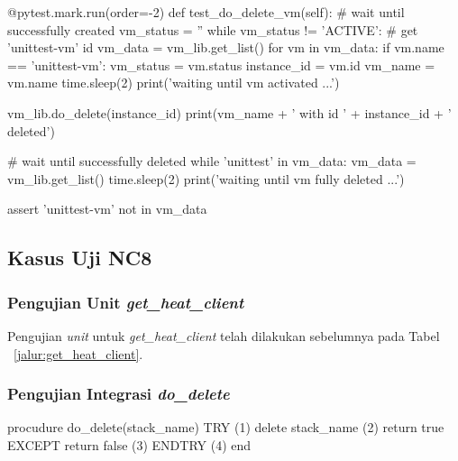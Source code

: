 \begin{code}
\begin{ignasicblock}[title=test\_do\_delete\_vm,minted language=Python]
@pytest.mark.run(order=-2)
    def test_do_delete_vm(self):
        # wait until successfully created
        vm_status = ''
        while vm_status != 'ACTIVE':
            # get 'unittest-vm' id
            vm_data = vm_lib.get_list()
            for vm in vm_data:
                if vm.name == 'unittest-vm':
                    vm_status = vm.status
                    instance_id = vm.id
                    vm_name = vm.name
            time.sleep(2)
            print('waiting until vm activated ...')

        vm_lib.do_delete(instance_id)
        print(vm_name + ' with id ' + instance_id + ' deleted')

        # wait until successfully deleted
        while 'unittest' in vm_data:
            vm_data = vm_lib.get_list()
            time.sleep(2)
            print('waiting until vm fully deleted ...')

        assert 'unittest-vm' not in vm_data
\end{ignasicblock}
\label{ts:rm-vm}
\end{code}

\subsection{Kasus Uji NC8}

\subsubsection{Pengujian Unit \emph{get\_heat\_client}}

Pengujian \emph{unit} untuk \emph{get\_heat\_client} telah dilakukan sebelumnya
pada Tabel ~\ref{jalur:get_heat_client}.

\subsubsection{Pengujian Integrasi \emph{do\_delete}}

\begin{code}
\begin{ignasicblock}[title=do\_delete,minted language=text]
procudure do_delete(stack_name)
    TRY                                   (1)
        delete stack_name                 (2)
        return true
    EXCEPT
        return false                      (3)
    ENDTRY                                (4)
end
    \end{ignasicblock}
  \label{pc:rm_stack}
\end{code}

